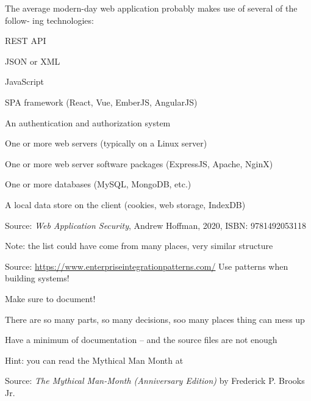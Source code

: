 \documentclass[Screen16to9,17pt]{foils}
\begin{document}
The average modern-day web application probably makes use of several of the follow‐
ing technologies:
\begin{list2}
\item  REST API
\item  JSON or XML
\item  JavaScript
\item  SPA framework (React, Vue, EmberJS, AngularJS)
\item  An authentication and authorization system
\item  One or more web servers (typically on a Linux server)
\item  One or more web server software packages (ExpressJS, Apache, NginX)
\item  One or more databases (MySQL, MongoDB, etc.)
\item  A local data store on the client (cookies, web storage, IndexDB)
\end{list2}
Source: \emph{Web Application Security}, Andrew Hoffman, 2020, ISBN: 9781492053118

Note: the list could have come from many places, very similar structure



Source: \url{https://www.enterpriseintegrationpatterns.com/}
Use patterns when building systems!








\begin{list2}
\item Make sure to document!
\item There are so many parts, so many decisions, soo many places thing can mess up
\item Have a minimum of documentation -- and the source files are not enough
\item Hint:  you can read the Mythical Man Month at 
\end{list2}


Source: \emph{The Mythical Man-Month (Anniversary Edition)}
by Frederick P. Brooks Jr.
\end{document}

